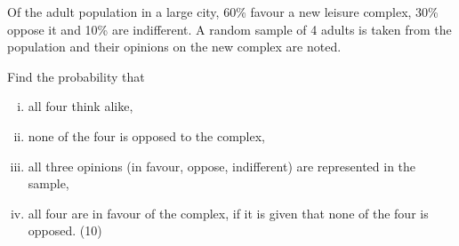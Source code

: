 \documentclass[a4paper,12pt]{article}
\begin{document}
\noindent Of the adult population in a large city, 60\% favour a new leisure complex, 30\% oppose it and 10\% are indifferent.  A random sample of 4 adults is taken from the population and their opinions on the new complex are noted. 
 
\begin{framed} 
Find the probability that 

\begin{enumerate}[(i)]
\item all four think alike, 
\item  none of the four is opposed to the complex, 
\item all three opinions (in favour, oppose, indifferent) are represented in the sample, 
\item  all four are in favour of the complex, if it is given that none of the four is opposed. (10) 
\end{enumerate} 
\end{framed} 

 
 
\end{document}
